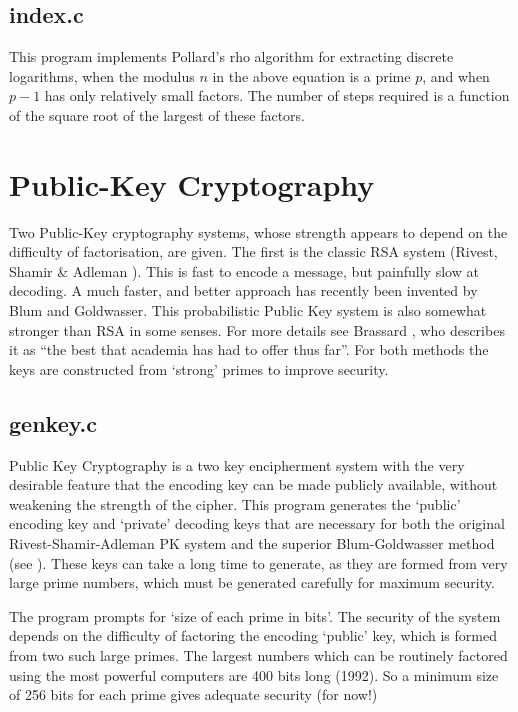       \subsection{index.c}

      This program implements Pollard's rho algorithm for extracting discrete 
logarithms, when the modulus $n$ in the above equation is a prime $p$, and 
when $p-1$ has only relatively small factors. The number of steps required is a 
function of the square root of the largest of these factors. 


      \section{Public-Key Cryptography}

      Two Public-Key cryptography systems, whose strength appears to depend 
      on  the  difficulty  of  factorisation,  are given.  The first is the 
      classic RSA system (Rivest,  Shamir \& Adleman \cite{RSA}). This is fast to 
      encode a message, but painfully slow at decoding.  A much faster, and 
      better approach has recently been invented  by  Blum  and Goldwasser. 
      This probabilistic Public Key system is also somewhat stronger  than
      RSA in some senses.   For  more  details  see  Brassard \cite{Brassard},  who 
      describes it as  ``the best that academia has had to offer thus  far''. 
      For both methods  the  keys  are  constructed  from  `strong'  primes
      to improve security.  

      \subsection{genkey.c}

      Public  Key  Cryptography  is  a two key encipherment system with the 
      very desirable feature that the encoding key  can  be  made  publicly 
      available, without weakening the strength of the cipher. This program 
      generates the `public' encoding key and `private' decoding keys  that 
      are necessary for both the original Rivest-Shamir-Adleman PK  system 
      and the superior Blum-Goldwasser method (see \cite{Brassard}). These keys 
      can take a long
      time to generate, as they are formed from very large  prime  numbers,
      which must be generated carefully for maximum security.  
              
      The program prompts for `size of each prime in bits'. The 
      security of the system depends on the  difficulty  of  factoring  the 
      encoding  `public'  key,  which is formed from two such large primes. The 
      largest numbers which  can  be  routinely  factored  using  the  most 
      powerful computers are 400 bits long (1992). So a minimum size of 
      256 bits for each prime gives adequate security (for now!) 

